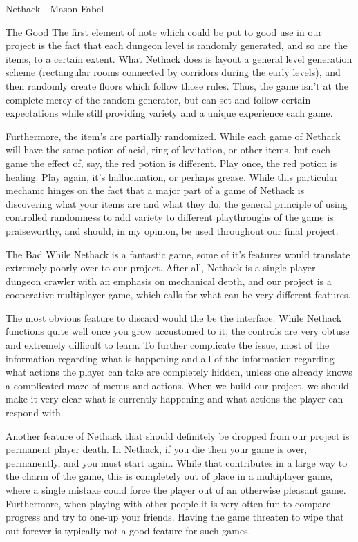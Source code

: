 \documentclass[12pt]{report}
\begin{document}
\begin{section}{Nethack - Mason Fabel}
\begin{subsection}{The Good}
The first element of note which could be put to good use in our project
is the fact that each dungeon level is randomly generated, and so are
the items, to a certain extent. What Nethack does is layout a general
level generation scheme (rectangular rooms connected by corridors during
the early levels), and then randomly create floors which follow those
rules. Thus, the game isn't at the complete mercy of the random generator,
but can set and follow certain expectations while still providing variety
and a unique experience each game.

Furthermore, the item's are partially randomized. While each game of
Nethack will have the same potion of acid, ring of levitation, or other
items, but each game the effect of, say, the red potion is different.
Play once, the red potion is healing. Play again, it's hallucination, or
perhaps grease. While this particular mechanic hinges on the fact that a
major part of a game of Nethack is discovering what your items are and
what they do, the general principle of using controlled randomness to add
variety to different playthroughs of the game is praiseworthy, and should,
in my opinion, be used throughout our final project.
\end{subsection}

\begin{subsection}{The Bad}
While Nethack is a fantastic game, some of it's features would translate
extremely poorly over to our project. After all, Nethack is a single-player
dungeon crawler with an emphasis on mechanical depth, and our project
is a cooperative multiplayer game, which calls for what can be very
different features.

The most obvious feature to discard would the be the interface. While
Nethack functions quite well once you grow accustomed to it, the controls
are very obtuse and extremely difficult to learn. To further complicate
the issue, most of the information regarding what is happening and all of
the information regarding what actions the player can take are completely
hidden, unless one already knows a complicated maze of menus and actions.
When we build our project, we should make it very clear what is currently
happening and what actions the player can respond with.

Another feature of Nethack that should definitely be dropped from our
project is permanent player death. In Nethack, if you die then your game is
over, permanently, and you must start again. While that contributes in a
large way to the charm of the game, this is completely out of place in a
multiplayer game, where a single mistake could force the player out of an
otherwise pleasant game. Furthermore, when playing with other people it
is very often fun to compare progress and try to one-up your friends.
Having the game threaten to wipe that out forever is typically not a good
feature for such games.
\end{subsection}

\end{section}
\end{document}
